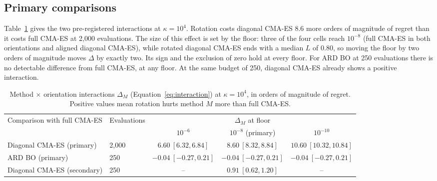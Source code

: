 \documentclass[12pt]{article}
\begin{document}
\subsection{Primary comparisons}
Table~\ref{tab:primary} gives the two pre-registered interactions at $\kappa=10^4$. Rotation costs diagonal CMA-ES 8.6 more orders of magnitude of regret than it costs full CMA-ES at 2{,}000 evaluations. The size of this effect is set by the floor: three of the four cells reach $10^{-8}$ (full CMA-ES in both orientations and aligned diagonal CMA-ES), while rotated diagonal CMA-ES ends with a median $L$ of $0.80$, so moving the floor by two orders of magnitude moves $\Delta$ by exactly two. Its sign and the exclusion of zero hold at every floor. For ARD BO at 250 evaluations there is no detectable difference from full CMA-ES, at any floor. At the same budget of 250, diagonal CMA-ES already shows a positive interaction.

\begin{table}[h]
\centering
\small
\begin{tabular}{llccc}
\hline
Comparison with full CMA-ES & Evaluations & \multicolumn{3}{c}{$\Delta_M$ at floor} \\
 & & $10^{-6}$ & $10^{-8}$ (primary) & $10^{-10}$ \\
\hline
Diagonal CMA-ES (primary) & 2{,}000 & $6.60\ [6.32, 6.84]$ & $8.60\ [8.32, 8.84]$ & $10.60\ [10.32, 10.84]$ \\
ARD BO (primary) & 250 & $-0.04\ [-0.27, 0.21]$ & $-0.04\ [-0.27, 0.21]$ & $-0.04\ [-0.27, 0.21]$ \\
Diagonal CMA-ES (secondary) & 250 & -- & $0.91\ [0.62, 1.20]$ & -- \\
\hline
\end{tabular}
\caption{Method $\times$ orientation interactions $\Delta_M$ (Equation~\ref{eq:interaction}) at $\kappa=10^4$, in orders of magnitude of regret. Positive values mean rotation hurts method $M$ more than full CMA-ES.}
\label{tab:primary}
\end{table}
\end{document}
